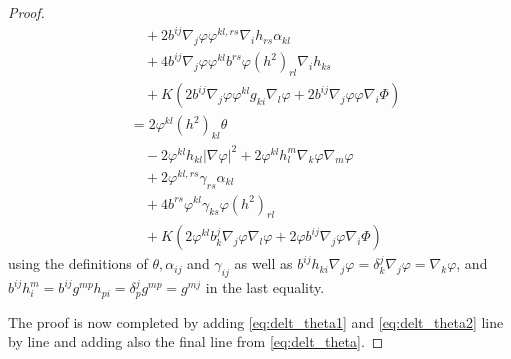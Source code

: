 \documentclass[12pt]{amsart}
\begin{document}
\begin{proof}
\begin{equation}
\begin{split}
&\quad + 2 b^{ij} \nabla_j\varphi \varphi^{kl,rs}\nabla_i h_{rs} \alpha_{kl} \\
&\quad + 4 b^{ij} \nabla_j\varphi \varphi^{kl} b^{rs} \varphi(h^2)_{rl} \nabla_i h_{ks} \\
&\quad + K\left(2 b^{ij} \nabla_j\varphi \varphi^{kl}g_{ki} \nabla_l \varphi + 2 b^{ij} \nabla_j\varphi \varphi \nabla_i \Phi\right) \\
&= 2 \varphi^{kl}(h^2)_{kl}\theta \\
&\quad - 2 \varphi^{kl}h_{kl} |\nabla\varphi|^2 + 2 \varphi^{kl} h^{m}_{l} \nabla_k\varphi \nabla_m \varphi \\
&\quad + 2 \varphi^{kl,rs} \gamma_{rs} \alpha_{kl} \\
&\quad + 4 b^{rs} \varphi^{kl} \gamma_{ks} \varphi(h^2)_{rl} \\
&\quad + K\left(2 \varphi^{kl} b^j_k \nabla_j\varphi \nabla_l \varphi + 2 \varphi b^{ij} \nabla_j\varphi \nabla_i \Phi\right)
\end{split}
\end{equation}
using the definitions of \(\theta, \alpha_{ij}\) and \(\gamma_{ij}\) as well as \(b^{ij}h_{ki} \nabla_j \varphi = \delta^j_k \nabla_j \varphi = \nabla_k \varphi\), and \(b^{ij} h^m_i = b^{ij} g^{mp}h_{pi} = \delta^j_p g^{mp} = g^{mj}\) in the last equality.

The proof is now completed by adding \cref{eq:delt_theta1} and \cref{eq:delt_theta2} line by line and adding also the final line from \cref{eq:delt_theta}.
\end{proof}
\end{document}
